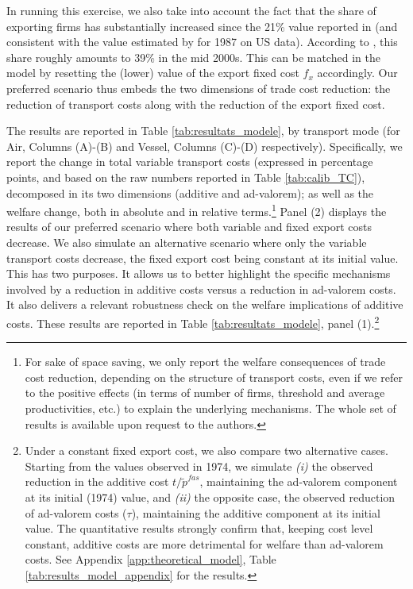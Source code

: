 \documentclass[a4paper,11pt]{article}
\begin{document}
In running this exercise, we also take into account the fact that the share of exporting firms has substantially increased since the 21\% value reported in \cite{BEJK-AER-03} (and consistent with the value estimated by \citet{Lincoln_McCallum2018} for 1987 on US data). According to \cite{Lincoln_McCallum2018}, this share roughly amounts to 39\% in the mid 2000s. This can be matched in the model by resetting the (lower) value of the export fixed cost $f_x$ accordingly. Our preferred scenario thus embeds the two dimensions of trade cost reduction: the reduction of transport costs along with the reduction of the export fixed cost.



The results are reported in Table \ref{tab:resultats_modele}, by transport mode (for Air, Columns (A)-(B) and Vessel, Columns (C)-(D) respectively). Specifically, we report the change in total variable transport costs (expressed in percentage points, and based on the raw numbers reported in Table \ref{tab:calib_TC}), decomposed in its two dimensions (additive and ad-valorem); as well as the welfare change, both in absolute and in relative terms.\footnote{For sake of space saving, we only report the welfare consequences of trade cost reduction, depending on the structure of transport costs, even if we refer to the positive effects (in terms of number of firms, threshold and average productivities, etc.) to explain the underlying mechanisms. The whole set of results is available upon request to the authors.} Panel (2) displays the results of our preferred scenario where both variable and fixed export costs decrease. We also simulate an alternative scenario where only the variable transport costs decrease, the fixed export cost being constant at its initial value. This has two purposes. It allows us to better highlight the specific mechanisms involved by a reduction in additive costs versus a reduction in ad-valorem costs. It also delivers a relevant robustness check on the welfare implications of additive costs. These results are reported in Table \ref{tab:resultats_modele}, panel (1).\footnote{Under a constant fixed export cost, we also compare two alternative cases. Starting from the values observed in 1974, we simulate \textit{(i)} the observed reduction in the additive cost $t/\widetilde{p}^{fas}$, maintaining the ad-valorem component at its initial (1974) value, and  \textit{(ii)} the opposite case, the observed reduction of ad-valorem costs ($\tau$), maintaining the additive component at its initial value. The quantitative results strongly confirm that, keeping cost level constant, additive costs are more detrimental for welfare than ad-valorem costs.
See Appendix \ref{app:theoretical_model}, Table \ref{tab:results_model_appendix} for the results.}
\end{document}
